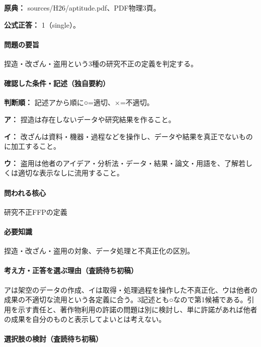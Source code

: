 \noindent\textbf{原典：} sources/H26/aptitude.pdf、PDF物理3頁。

\textbf{公式正答：} 1（single）。

\paragraph{問題の要旨} 捏造・改ざん・盗用という3種の研究不正の定義を判定する。

\paragraph{確認した条件・記述（独自要約）}\mbox{}\par

\noindent\textbf{判断順：} 記述アから順に○=適切、×=不適切。\par

\noindent\textbf{ア：} 捏造は存在しないデータや研究結果を作ること。\par

\noindent\textbf{イ：} 改ざんは資料・機器・過程などを操作し、データや結果を真正でないものに加工すること。\par

\noindent\textbf{ウ：} 盗用は他者のアイデア・分析法・データ・結果・論文・用語を、了解若しくは適切な表示なしに流用すること。\par

\paragraph{問われる核心} 研究不正FFPの定義

\paragraph{必要知識} 捏造・改ざん・盗用の対象、データ処理と不真正化の区別。

\paragraph{考え方・正答を選ぶ理由（査読待ち初稿）} アは架空のデータの作成、イは取得・処理過程を操作した不真正化、ウは他者の成果の不適切な流用という各定義に合う。3記述とも○なので第1候補である。引用を示す責任と、著作物利用の許諾の問題は別に検討し、単に許諾があれば他者の成果を自分のものと表示してよいとは考えない。

\paragraph{選択肢の検討（査読待ち初稿）}\mbox{}\par

